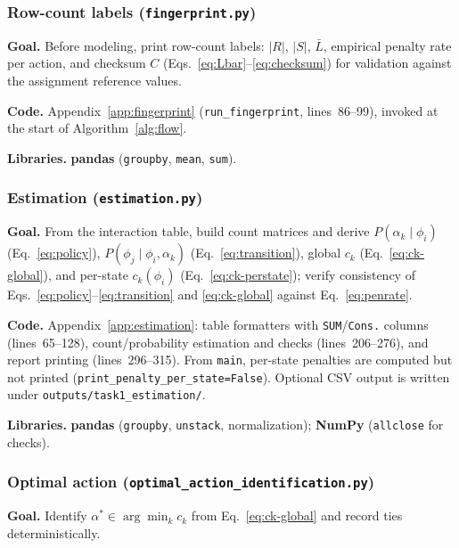 \documentclass[11pt,a4paper]{article}
\begin{document}
\subsubsection{Row-count labels (\texttt{fingerprint.py})}\label{sec:impl-fingerprint}

\textbf{Goal.}\; Before modeling, print row-count labels: $|R|$, $|S|$, $\bar{L}$,
empirical penalty rate per action, and checksum $C$
(Eqs.~\eqref{eq:Lbar}--\eqref{eq:checksum}) for validation against the
assignment reference values.

\textbf{Code.}\;
Appendix~\ref{app:fingerprint} (\texttt{run\_fingerprint}, lines~86--99), invoked at
the start of Algorithm~\ref{alg:flow}.

\textbf{Libraries.}\; \textbf{pandas} (\texttt{groupby}, \texttt{mean}, \texttt{sum}).

\subsubsection{Estimation (\texttt{estimation.py})}\label{sec:impl-estimation}

\textbf{Goal.}\; From the interaction table, build count matrices and derive
$P(\alpha_k\mid\phi_i)$ (Eq.~\eqref{eq:policy}),
$P(\phi_j\mid\phi_i,\alpha_k)$ (Eq.~\eqref{eq:transition}),
global $c_k$ (Eq.~\eqref{eq:ck-global}), and
per-state $c_k(\phi_i)$ (Eq.~\eqref{eq:ck-perstate}); verify consistency of
Eqs.~\eqref{eq:policy}--\eqref{eq:transition} and \eqref{eq:ck-global} against
Eq.~\eqref{eq:penrate}.

\textbf{Code.}\;
Appendix~\ref{app:estimation}: table formatters with \texttt{SUM}/\texttt{Cons.}
columns (lines~65--128), count/probability estimation and checks (lines~206--276),
and report printing (lines~296--315).
From \texttt{main}, per-state penalties are computed but not printed
(\nolinkurl{print_penalty_per_state=False}).
Optional CSV output is written under \nolinkurl{outputs/task1_estimation/}.

\textbf{Libraries.}\; \textbf{pandas} (\texttt{groupby}, \texttt{unstack}, normalization);
\textbf{NumPy} (\texttt{allclose} for checks).

\subsubsection{Optimal action (\texttt{optimal\_action\_identification.py})}\label{sec:impl-optimal}

\textbf{Goal.}\; Identify $\alpha^\ast \in \arg\min_k c_k$ from Eq.~\eqref{eq:ck-global}
and record ties deterministically.
\end{document}
